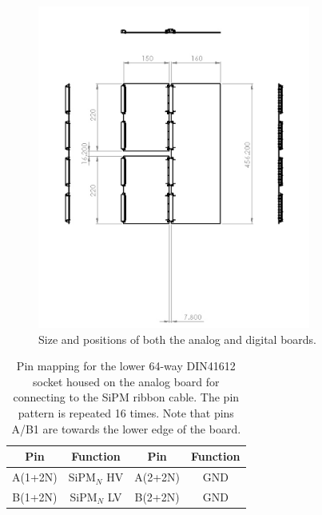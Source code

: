\documentclass[a4paper]{article}
\begin{document}
\begin{figure}[h]
    \begin{center}
        \includegraphics[width=0.8\textwidth]{imgs/Amplifier_Board_Pair_2D}
        \caption{Size and positions of both the analog and digital boards.}
        \label{fig:analogdigitalboardsize}
    \end{center}
\end{figure}


\begin{table}[h]
    \begin{center}
        \caption{Pin mapping for the lower 64-way DIN41612 socket housed on the analog board for connecting to the SiPM ribbon cable. The pin pattern is repeated 16 times. Note that pins A/B1 are towards the lower edge of the board.}
        \label{tab:lowerIDC64way}
        \begin{tabular}{cc|cc}
            \hline
            \hline
            Pin & Function & Pin & Function \\
            \hline
            A(1+2N) & SiPM$_N$ HV & A(2+2N) & GND \\
            B(1+2N) & SiPM$_N$ LV & B(2+2N) & GND \\
            \hline
            \hline
        \end{tabular}
    \end{center}
\end{table}
\end{document}
